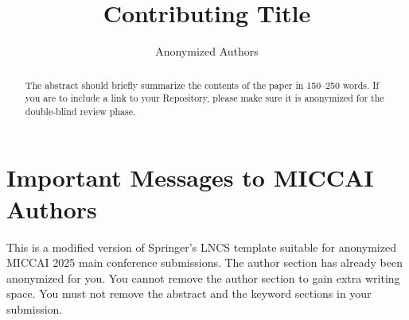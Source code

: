 \documentclass[runningheads]{llncs}
\begin{document}
%
\title{Contributing Title}
%

\author{Anonymized Authors}  %

    
\maketitle              %
%
\begin{abstract}
The abstract should briefly summarize the contents of the paper in 150--250 words.  If you are to include a link to your Repository, please make sure it is anonymized for the double-blind review phase.


\end{abstract}
%
%
%
\section{Important Messages to MICCAI Authors}

This is a modified version of Springer's LNCS template suitable for anonymized MICCAI 2025 main conference submissions. The author section has already been anonymized for you.  You cannot remove the author section to gain extra writing space.  You must not remove the abstract and the keyword sections in your submission.
\end{document}

